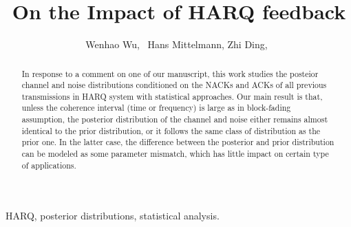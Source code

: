 \documentclass[journal,draftcls,onecolumn,12pt,twoside]{IEEEtran}
\begin{document}
%
\title{On the Impact of HARQ feedback}
%
%
%

\author{
  Wenhao Wu,~
  Hans Mittelmann,
  Zhi Ding,~
}

\maketitle

\begin{abstract}
  In response to a comment on one of our manuscript, this work studies the
  posteior channel and noise distributions conditioned on the NACKs and ACKs of
  all previous transmissions in HARQ system with statistical approaches. Our main
  result is that, unless the coherence interval (time or frequency) is large as
  in block-fading assumption, the posterior distribution of the channel and
  noise either remains almost identical to the prior distribution, or it
  follows the same class of distribution as the prior one. In the latter case,
  the difference between the posterior and prior distribution can be modeled as
  some parameter mismatch, which has little impact on certain type of
  applications.
\end{abstract}

\begin{IEEEkeywords}
  HARQ, posterior distributions, statistical analysis.
\end{IEEEkeywords}






%
\IEEEpeerreviewmaketitle
\end{document}
